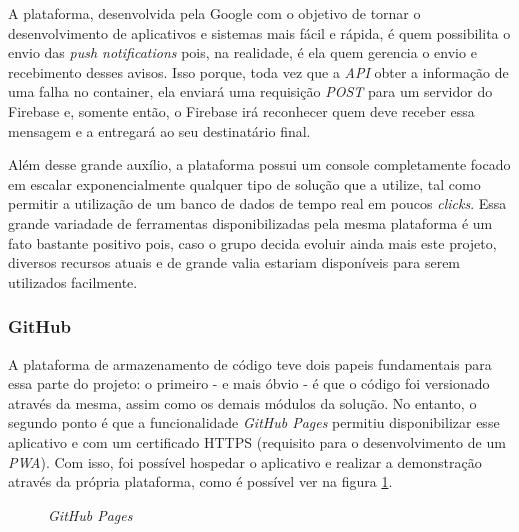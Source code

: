 A plataforma, desenvolvida pela Google com o objetivo de tornar o desenvolvimento de aplicativos e sistemas mais fácil e rápida, é quem possibilita o envio das \textit{push notifications} pois, na realidade, é ela quem gerencia o envio e recebimento desses avisos. Isso porque, toda vez que a \textit{API} obter a informação de uma falha no container, ela enviará uma requisição \textit{POST} para um servidor do Firebase e, somente então, o Firebase irá reconhecer quem deve receber essa mensagem e a entregará ao seu destinatário final.

Além desse grande auxílio, a plataforma possui um console completamente focado em escalar exponencialmente qualquer tipo de solução que a utilize, tal como permitir a utilização de um banco de dados de tempo real em poucos \textit{clicks}. Essa grande variadade de ferramentas disponibilizadas pela mesma plataforma é um fato bastante positivo pois, caso o grupo decida evoluir ainda mais este projeto, diversos recursos atuais e de grande valia estariam disponíveis para serem utilizados facilmente.


\subsubsection{GitHub}
\label{subsubsec:github}

A plataforma de armazenamento de código teve dois papeis fundamentais para essa parte do projeto: o primeiro - e mais óbvio - é que o código foi versionado através da mesma, assim como os demais módulos da solução. No entanto, o segundo ponto é que a funcionalidade \textit{GitHub Pages} permitiu disponibilizar esse aplicativo \online{} e com um certificado HTTPS (requisito para o desenvolvimento de um \textit{PWA}). Com isso, foi possível hospedar o aplicativo e realizar a demonstração através da própria plataforma, como é possível ver na figura \ref{fig:github_pages}.

\begin{figure}[H]
    \centering
    \caption{\textit{GitHub Pages}}
    \label{fig:github_pages}
\end{figure}


